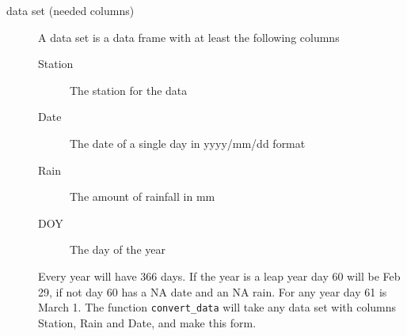 \documentclass{article}
\begin{document}
\begin{description}
\item[data set (needed columns)]  A data set is a data frame with at least the following columns
    \begin{description}
    \item[Station]  The station for the data
    \item[Date]  The date of a single day in yyyy/mm/dd format
    \item[Rain]  The amount of rainfall in mm
    \item[DOY]  The day of the year
    \end{description}
    Every year will have 366 days.  If the year is a leap year day 60
    will be Feb 29, if not day 60 has a NA date and an NA rain.  For any year
    day 61 is March 1.  The function {\tt convert\_data} will take
    any data set with columns Station, Rain and Date, and make this form.
    


\end{description}
\end{document}
